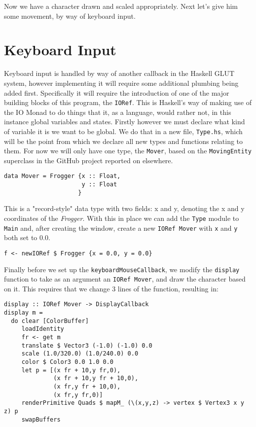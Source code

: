 \documentclass[12pt, a4paper]{report}
\begin{document}
Now we have a character drawn and scaled appropriately.
Next let's give him some movement, by way of keyboard input.

\section{Keyboard Input}

Keyboard input is handled by way of another callback in the Haskell GLUT system, however implementing it will require some additional plumbing being added first.
Specifically it will require the introduction of one of the major building blocks of this program, the \verb|IORef|.
This is Haskell's way of making use of the IO Monad to do things that it, as a language, would rather not, in this instance global variables and states.
Firstly however we must declare what kind of variable it is we want to be global.
We do that in a new file, \verb|Type.hs|, which will be the point from which we declare all new types and functions relating to them.
For now we will only have one type, the \verb|Mover|, based on the \verb|MovingEntity| superclass in the GitHub project reported on elsewhere.

\begin{lstlisting}
data Mover = Frogger {x :: Float,
                      y :: Float
                     }
\end{lstlisting}

This is a "record-style" data type with two fields: x and y, denoting the x and y coordinates of the \textit{Frogger}.
With this in place we can add the \verb|Type| module to \verb|Main| and, after creating the window, create a new \verb|IORef Mover| with \verb|x| and \verb|y| both set to 0.0.

\begin{lstlisting}
f <- newIORef $ Frogger {x = 0.0, y = 0.0}
\end{lstlisting}

Finally before we set up the \verb|keyboardMouseCallback|, we modify the \verb|display| function to take as an argument an \verb|IORef Mover|, and draw the character based on it.
This requires that we change 3 lines of the function, resulting in:

\begin{lstlisting}[xleftmargin=-0.1\textwidth, xrightmargin=-0.1\textwidth]
display :: IORef Mover -> DisplayCallback
display m =
  do clear [ColorBuffer]
     loadIdentity
     fr <- get m
     translate $ Vector3 (-1.0) (-1.0) 0.0
     scale (1.0/320.0) (1.0/240.0) 0.0
     color $ Color3 0.0 1.0 0.0
     let p = [(x fr + 10,y fr,0),
              (x fr + 10,y fr + 10,0),
              (x fr,y fr + 10,0),
              (x fr,y fr,0)]
     renderPrimitive Quads $ mapM_ (\(x,y,z) -> vertex $ Vertex3 x y z) p
     swapBuffers
\end{lstlisting}
\end{document}
